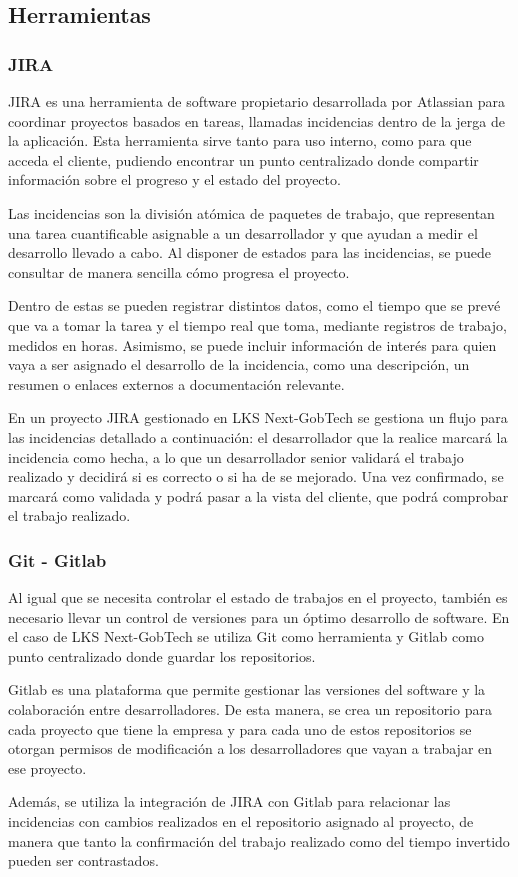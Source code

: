 \subsection{Herramientas}
\subsubsection{JIRA}
JIRA es una herramienta de software propietario desarrollada por Atlassian para coordinar proyectos basados en tareas, llamadas incidencias dentro de la jerga de la aplicación. Esta herramienta sirve tanto para uso interno, como para que acceda el cliente, pudiendo encontrar un punto centralizado donde compartir información sobre el progreso y el estado del proyecto.

Las incidencias son la división atómica de paquetes de trabajo, que representan una tarea cuantificable asignable a un desarrollador y que ayudan a medir el desarrollo llevado a cabo. Al disponer de estados para las incidencias, se puede consultar de manera sencilla cómo progresa el proyecto. 

Dentro de estas se pueden registrar distintos datos, como el tiempo que se prevé que va a tomar la tarea y el tiempo real que toma, mediante registros de trabajo, medidos en horas. Asimismo, se puede incluir información de interés para quien vaya a ser asignado el desarrollo de la incidencia, como una descripción, un resumen o enlaces externos a documentación relevante.

En un proyecto JIRA gestionado en LKS Next-GobTech se gestiona un flujo para las incidencias detallado a continuación: el desarrollador que la realice marcará la incidencia como hecha, a lo que un desarrollador senior validará el trabajo realizado y decidirá si es correcto o si ha de se mejorado. Una vez confirmado, se marcará como validada y podrá pasar a la vista del cliente, que podrá comprobar el trabajo realizado.

\subsubsection{Git - Gitlab}
Al igual que se necesita controlar el estado de trabajos en el proyecto, también es necesario llevar un control de versiones para un óptimo desarrollo de software. En el caso de LKS Next-GobTech se utiliza Git \cite{chacon2014progit} como herramienta y Gitlab como punto centralizado donde guardar los repositorios. 

Gitlab es una plataforma que permite gestionar las versiones del software y la colaboración entre desarrolladores. De esta manera, se crea un repositorio para cada proyecto que tiene la empresa y para cada uno de estos repositorios se otorgan permisos de modificación a los desarrolladores que vayan a trabajar en ese proyecto.

Además, se utiliza la integración de JIRA con Gitlab para relacionar las incidencias con cambios realizados en el repositorio asignado al proyecto, de manera que tanto la confirmación del trabajo realizado como del tiempo invertido pueden ser contrastados.